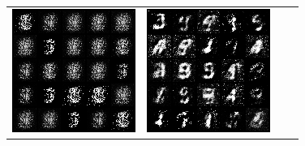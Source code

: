 \documentclass{article}
\begin{document}
\begin{figure}
  \centering
  \begin{tabularx}{\linewidth}{XXXX}
    \includegraphics[width=\linewidth]{assignment_3/code/figures/gan_2000.png} &
    \includegraphics[width=\linewidth]{assignment_3/code/figures/gan_8000.png} &

\end{tabularx}
\end{figure}
\end{document}

